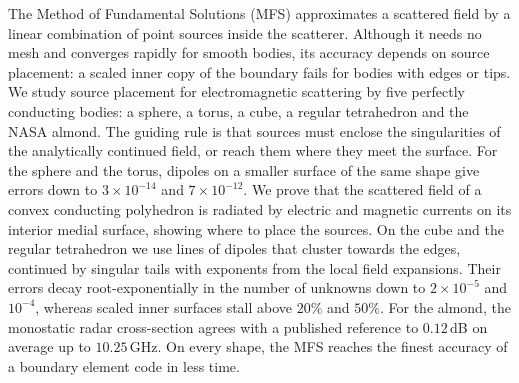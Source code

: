 The Method of Fundamental Solutions (MFS) approximates a scattered field by a linear combination of point sources inside the scatterer. Although it needs no mesh and converges rapidly for smooth bodies, its accuracy depends on source placement: a scaled inner copy of the boundary fails for bodies with edges or tips. We study source placement for electromagnetic scattering by five perfectly conducting bodies: a sphere, a torus, a cube, a regular tetrahedron and the NASA almond. The guiding rule is that sources must enclose the singularities of the analytically continued field, or reach them where they meet the surface. For the sphere and the torus, dipoles on a smaller surface of the same shape give errors down to $3\times10^{-14}$ and $7\times10^{-12}$. We prove that the scattered field of a convex conducting polyhedron is radiated by electric and magnetic currents on its interior medial surface, showing where to place the sources. On the cube and the regular tetrahedron we use lines of dipoles that cluster towards the edges, continued by singular tails with exponents from the local field expansions. Their errors decay root-exponentially in the number of unknowns down to $2\times10^{-5}$ and $10^{-4}$, whereas scaled inner surfaces stall above $20\%$ and $50\%$. For the almond, the monostatic radar cross-section agrees with a published reference to $0.12$\,dB on average up to $10.25$\,GHz. On every shape, the MFS reaches the finest accuracy of a boundary element code in less time.
